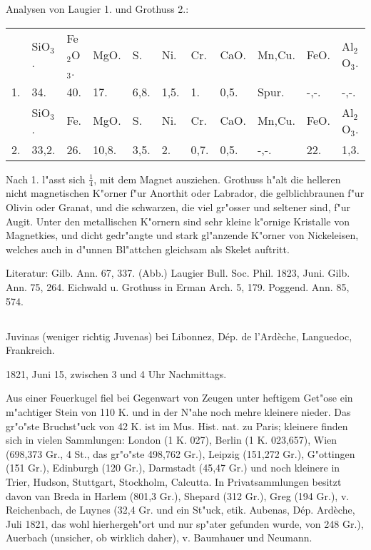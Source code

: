 \documentclass[a4paper, 11pt, oneside]{article}
\begin{document}
Analysen von Laugier 1. und Grothuss 2.:
\begin{table}[!ht]
    \centering\swabfamily\Large
    \begin{tabular}{p{3mm} p{6mm} p{7mm} p{6mm} p{6mm} p{6mm} p{6mm} p{6mm} p{12mm} p{6mm} p{6mm}}
         & SiO$_{3}$. & Fe$_{2}$O$_{3}$. & MgO. & S. & Ni. & Cr. & CaO. & Mn,Cu. & FeO. & Al$_{2}$O$_{3}$. \\
        1. & 34. & 40. & 17. & 6,8. & 1,5. & 1. & 0,5. & Spur. & -,-. & -,-. \\ \hline
         & SiO$_{3}$. & Fe. & MgO. & S. & Ni. & Cr. & CaO. & Mn,Cu. & FeO. & Al$_{2}$O$_{3}$. \\
        2. & 33,2. & 26. & 10,8. & 3,5. & 2. & 0,7. & 0,5. & -,-. & 22. & 1,3. \\
    \end{tabular}
\end{table}

Nach 1. l"asst sich $\mathfrak{\frac{1}{4}}$, mit dem Magnet ausziehen. Grothuss h"alt die helleren nicht magnetischen K"orner f"ur Anorthit oder Labrador, die gelblichbraunen f"ur Olivin oder Granat, und die schwarzen, die viel gr"osser und seltener sind, f"ur Augit. Unter den metallischen K"ornern sind sehr kleine k"ornige Kristalle von Magnetkies, und dicht gedr"angte und stark gl"anzende K"orner von Nickeleisen, welches auch in d"unnen Bl"attchen gleichsam als Skelet auftritt.

\normalsize
Literatur: Gilb. Ann. 67, 337. (Abb.) Laugier Bull. Soc. Phil. 1823, Juni. Gilb. Ann. 75, 264. Eichwald u. Grothuss in Erman Arch. 5, 179. Poggend. Ann. 85, 574.
\subsection{}
\LARGE
\paragraph{}
Juvinas (weniger richtig Juvenas) bei Libonnez, Dép. de l'Ardèche, Languedoc, Frankreich.

1821, Juni 15, zwischen 3 und 4 Uhr Nachmittags.

Aus einer Feuerkugel fiel bei Gegenwart von Zeugen unter heftigem Get"ose ein m"achtiger Stein von 110 K. und in der N"ahe noch mehre kleinere nieder. Das gr"o"ste Bruchst"uck von 42 K. ist im Mus. Hist. nat. zu Paris; kleinere finden sich in vielen Sammlungen: London (1 K. 027), Berlin (1 K. 023,657), Wien (698,373 Gr., 4 St., das gr"o"ste 498,762 Gr.), Leipzig (151,272 Gr.), G"ottingen (151 Gr.), Edinburgh (120 Gr.), Darmstadt (45,47 Gr.) und noch kleinere in Trier, Hudson, Stuttgart, Stockholm, Calcutta. In Privatsammlungen besitzt davon van Breda in Harlem (801,3 Gr.), Shepard (312 Gr.), Greg (194 Gr.), v. Reichenbach, de Luynes (32,4 Gr. und ein St"uck, etik. Aubenas, Dép. Ardèche, Juli 1821, das wohl hierhergeh"ort und nur sp"ater gefunden wurde, von 248 Gr.), Auerbach (unsicher, ob wirklich daher), v. Baumhauer und Neumann.
\end{document}
